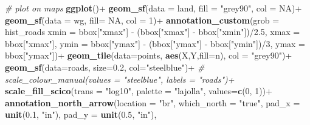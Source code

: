 \documentclass[]{article}
\newenvironment{Shaded}{}{}
\newcommand{\CommentTok}[1]{\textcolor[rgb]{0.38,0.63,0.69}{\textit{#1}}}
\newcommand{\DataTypeTok}[1]{\textcolor[rgb]{0.56,0.13,0.00}{#1}}
\newcommand{\DecValTok}[1]{\textcolor[rgb]{0.25,0.63,0.44}{#1}}
\newcommand{\FloatTok}[1]{\textcolor[rgb]{0.25,0.63,0.44}{#1}}
\newcommand{\KeywordTok}[1]{\textcolor[rgb]{0.00,0.44,0.13}{\textbf{#1}}}
\newcommand{\NormalTok}[1]{#1}
\newcommand{\OperatorTok}[1]{\textcolor[rgb]{0.40,0.40,0.40}{#1}}
\newcommand{\OtherTok}[1]{\textcolor[rgb]{0.00,0.44,0.13}{#1}}
\newcommand{\StringTok}[1]{\textcolor[rgb]{0.25,0.44,0.63}{#1}}
\begin{document}
\begin{Shaded}
\begin{Highlighting}[]
\CommentTok{# plot on maps}
\KeywordTok{ggplot}\NormalTok{()}\OperatorTok{+}
\StringTok{  }\KeywordTok{geom_sf}\NormalTok{(}\DataTypeTok{data =}\NormalTok{ land, }\DataTypeTok{fill =} \StringTok{"grey90"}\NormalTok{, }\DataTypeTok{col =} \OtherTok{NA}\NormalTok{)}\OperatorTok{+}
\StringTok{  }\KeywordTok{geom_sf}\NormalTok{(}\DataTypeTok{data =}\NormalTok{ wg, }\DataTypeTok{fill=} \OtherTok{NA}\NormalTok{, }\DataTypeTok{col =} \DecValTok{1}\NormalTok{)}\OperatorTok{+}
\StringTok{  }\KeywordTok{annotation_custom}\NormalTok{(}\DataTypeTok{grob =}\NormalTok{ hist_roads }\OperatorTok{%
                    \DataTypeTok{xmin =}\NormalTok{ bbox[}\StringTok{"xmax"}\NormalTok{] }\OperatorTok{-}\StringTok{ }\NormalTok{(bbox[}\StringTok{"xmax"}\NormalTok{] }\OperatorTok{-}\StringTok{ }\NormalTok{bbox[}\StringTok{"xmin"}\NormalTok{])}\OperatorTok{/}\FloatTok{2.5}\NormalTok{, }
                    \DataTypeTok{xmax =}\NormalTok{ bbox[}\StringTok{"xmax"}\NormalTok{], }
                    \DataTypeTok{ymin =}\NormalTok{ bbox[}\StringTok{"ymax"}\NormalTok{] }\OperatorTok{-}\StringTok{ }\NormalTok{(bbox[}\StringTok{"ymax"}\NormalTok{] }\OperatorTok{-}\StringTok{ }\NormalTok{bbox[}\StringTok{"ymin"}\NormalTok{])}\OperatorTok{/}\DecValTok{3}\NormalTok{, }
                    \DataTypeTok{ymax =}\NormalTok{ bbox[}\StringTok{"ymax"}\NormalTok{])}\OperatorTok{+}
\StringTok{  }\KeywordTok{geom_tile}\NormalTok{(}\DataTypeTok{data=}\NormalTok{points, }\KeywordTok{aes}\NormalTok{(X,Y,}\DataTypeTok{fill=}\NormalTok{n), }\DataTypeTok{col =} \StringTok{"grey90"}\NormalTok{)}\OperatorTok{+}
\StringTok{  }
\StringTok{  }\KeywordTok{geom_sf}\NormalTok{(}\DataTypeTok{data=}\NormalTok{roads, }\DataTypeTok{size=}\FloatTok{0.2}\NormalTok{, }\DataTypeTok{col=}\StringTok{"steelblue"}\NormalTok{)}\OperatorTok{+}
\StringTok{  }
\StringTok{  }\CommentTok{# scale_colour_manual(values = "steelblue", labels = "roads")+}
\StringTok{  }
\StringTok{  }\KeywordTok{scale_fill_scico}\NormalTok{(}\DataTypeTok{trans =} \StringTok{"log10"}\NormalTok{, }\DataTypeTok{palette =} \StringTok{"lajolla"}\NormalTok{, }\DataTypeTok{values=}\KeywordTok{c}\NormalTok{(}\DecValTok{0}\NormalTok{, }\DecValTok{1}\NormalTok{))}\OperatorTok{+}
\StringTok{  }\KeywordTok{annotation_north_arrow}\NormalTok{(}\DataTypeTok{location =} \StringTok{"br"}\NormalTok{, }\DataTypeTok{which_north =} \StringTok{"true"}\NormalTok{, }
                         \DataTypeTok{pad_x =} \KeywordTok{unit}\NormalTok{(}\FloatTok{0.1}\NormalTok{, }\StringTok{"in"}\NormalTok{), }\DataTypeTok{pad_y =} \KeywordTok{unit}\NormalTok{(}\FloatTok{0.5}\NormalTok{, }\StringTok{"in"}\NormalTok{),}
}
\end{Highlighting}
\end{Shaded}
\end{document}
